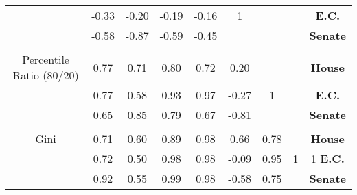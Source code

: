 \begin{landscape}
\begin{table}[!htbp]
\begin{tabular}{c|c|c|c|c|c|c|c|c}
{} & -0.33 & -0.20 & -0.19 & -0.16 & 1 &  & & \footnotesize{\textbf{E.C.}} \\ 
{} & -0.58 & -0.87 & -0.59 & -0.45 &  &  & & \footnotesize{\textbf{Senate}} \\ 
\hline \\[-1.8ex] 
{Percentile Ratio (80/20)} & 0.77 & 0.71 & 0.80 & 0.72 & 0.20 &  & & \footnotesize{\textbf{House}} \\ 
{} & 0.77 & 0.58 & 0.93 & 0.97 & -0.27 & 1 & & \footnotesize{\textbf{E.C.}} \\ 
{} & 0.65 & 0.85 & 0.79 & 0.67 & -0.81 &  & & \footnotesize{\textbf{Senate}} \\ 
\hline \\[-1.8ex] 
{Gini} & 0.71 & 0.60 & 0.89 & 0.98 & 0.66 & 0.78 & & \footnotesize{\textbf{House}} \\ 
{} & 0.72 & 0.50 & 0.98 & 0.98 & -0.09 & 0.95 & 1 & 1 \footnotesize{\textbf{E.C.}} \\ 
{} & 0.92 & 0.55 & 0.99 & 0.98 & -0.58 & 0.75 & &  \footnotesize{\textbf{Senate}} \\ 
\end{tabular}
\end{table}

\end{landscape}
 
